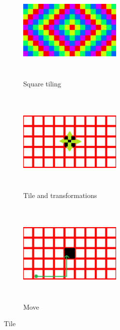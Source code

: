 \begin{figure}[h!tbp]
 \begin{subfigure}{0.3\textwidth}
  \center
  \includegraphics[width=2in, height=2in, keepaspectratio]{../img/tessellation/rectTile.pdf}
  \caption{Square tiling}
  \label{fig:rectTile}
 \end{subfigure}
 \hspace*{\fill}
 \begin{subfigure}{0.3\textwidth}
  \center
  \includegraphics[width=2in, height=2in, keepaspectratio]{../img/tessellation/tile.pdf}
  \caption{Tile and transformations}
  \label{fig:tile}
 \end{subfigure}
 \hspace*{\fill}
 \begin{subfigure}{0.3\textwidth}
  \center
  \includegraphics[width=2in, height=2in, keepaspectratio]{../img/tessellation/tileMove.pdf}
  \caption{Move}
  \label{fig:tileMove}
 \end{subfigure}
 \hspace*{\fill}
\caption{Tile}
\end{figure}

